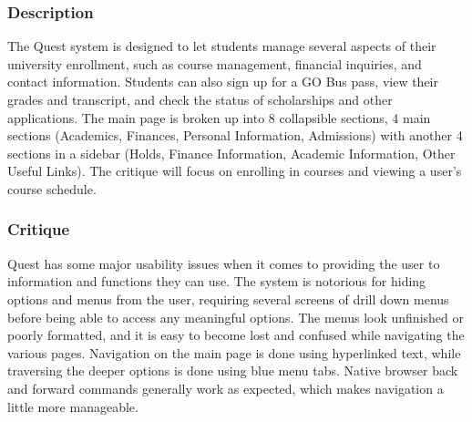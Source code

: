 \documentclass[10pt]{article}
\newenvironment{InlineColumnFigure}
{\par\medskip\noindent\minipage{\linewidth}}
{\endminipage\par\medskip}
\newcommand{\Caption}[1]
{\vspace{-4mm}\fontsize{9}{9}\textbf{Figure \refstepcounter{figCounter} 
\arabic{figCounter}: #1}}
\newcounter{figCounter}
\begin{document}
\begin{multicols}{2}
\subsubsection*{Description}
The Quest system is designed to let students manage several aspects 
of their university enrollment, such as course management, financial inquiries, 
and contact information. Students can also sign up for a GO Bus pass, view their 
grades and transcript, and check the status of scholarships and other 
applications. The main page is broken up into 8 collapsible sections, 4 main 
sections (Academics, Finances, Personal Information, Admissions) with another 4 
sections in a sidebar (Holds, Finance Information, Academic Information, Other 
Useful Links). The critique will focus on enrolling in courses and viewing a 
user's course schedule. 


\subsubsection*{Critique}
Quest has some major usability issues when it comes to providing the user to 
information and functions they can use. The system is notorious for hiding 
options and menus from the user, requiring several screens of drill down menus 
before being able to access any meaningful options. The menus look unfinished or 
poorly formatted, and it is easy to become lost and confused while navigating 
the various pages. Navigation on the main page is done using hyperlinked text, 
while traversing the deeper options is done using blue menu tabs. Native browser 
back and forward commands generally work as expected, which makes navigation a 
little more manageable. 


\end{multicols}
\end{document}
